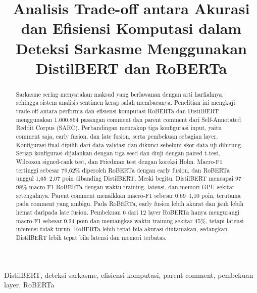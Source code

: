 \documentclass[conference]{IEEEtran}
\begin{document}
\title{Analisis Trade-off antara Akurasi dan Efisiensi Komputasi dalam Deteksi Sarkasme Menggunakan DistilBERT dan RoBERTa}

\author{
\and
{}
}

\maketitle

\begin{abstract}
Sarkasme sering menyatakan maksud yang berlawanan dengan arti harfiahnya, sehingga sistem analisis sentimen kerap salah membacanya. Penelitian ini mengkaji trade-off antara performa dan efisiensi komputasi RoBERTa dan DistilBERT menggunakan 1.000.864 pasangan comment dan parent comment dari Self-Annotated Reddit Corpus (SARC). Perbandingan mencakup tiga konfigurasi input, yaitu comment saja, early fusion, dan late fusion, serta pembekuan sebagian layer. Konfigurasi final dipilih dari data validasi dan dikunci sebelum skor data uji dihitung. Setiap konfigurasi dijalankan dengan tiga seed dan diuji dengan paired t-test, Wilcoxon signed-rank test, dan Friedman test dengan koreksi Holm. Macro-F1 tertinggi sebesar 79,62\% diperoleh RoBERTa dengan early fusion, dan RoBERTa unggul 1,65--2,07 poin dibanding DistilBERT. Meski begitu, DistilBERT mencapai 97--98\% macro-F1 RoBERTa dengan waktu training, latensi, dan memori GPU sekitar setengahnya. Parent comment menaikkan macro-F1 sebesar 0,69--1,10 poin, terutama pada comment yang ambigu. Pada RoBERTa, early fusion lebih akurat dan jauh lebih hemat daripada late fusion. Pembekuan 6 dari 12 layer RoBERTa hanya mengurangi macro-F1 sebesar 0,24 poin dan memangkas waktu training sekitar 45\%, tetapi latensi inferensi tidak turun. RoBERTa lebih tepat bila akurasi diutamakan, sedangkan DistilBERT lebih tepat bila latensi dan memori terbatas.
\end{abstract}

\begin{IEEEkeywords}
DistilBERT, deteksi sarkasme, efisiensi komputasi, parent comment, pembekuan layer, RoBERTa
\end{IEEEkeywords}
\end{document}

